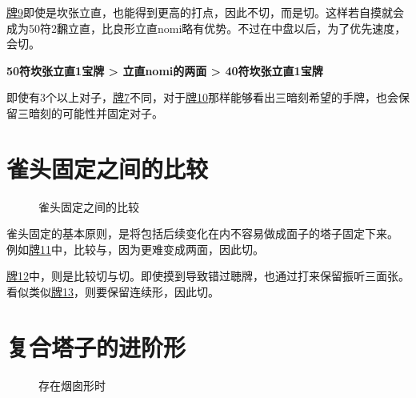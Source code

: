 \hyperref[lec7:pai8-10]{牌9}即使是坎张立直，也能得到更高的打点，因此不切，而是切。这样若自摸就会成为50符2飜立直，比良形立直nomi略有优势。不过在中盘以后，为了优先速度，会切。

\par\bigskip
\textbf{50符坎张立直1宝牌 > 立直nomi的两面 > 40符坎张立直1宝牌}
\par\bigskip

即使有3个以上对子，\hyperref[lec7:pai5-7]{牌7}不同，对于\hyperref[lec7:pai8-10]{牌10}那样能够看出三暗刻希望的手牌，也会保留三暗刻的可能性并固定对子。

\section{雀头固定之间的比较}
\begin{figure}[h]
    \caption{雀头固定之间的比较}
    \label{lec7:pai11-13}
    \par\bigskip
    \par\bigskip
\end{figure}

雀头固定的基本原则，是将包括后续变化在内不容易做成面子的塔子固定下来。
例如\hyperref[lec7:pai11-13]{牌11}中，比较与，因为更难变成两面，因此切。

\hyperref[lec7:pai11-13]{牌12}中，则是比较切与切。即使摸到导致错过聴牌，也通过打来保留振听三面张。
看似类似\hyperref[lec7:pai11-13]{牌13}，则要保留连续形，因此切。

\section{复合塔子的进阶形}
\begin{figure}[h]
    \caption{存在烟囱形时}
    \label{lec7:pai14-16}
    \par\bigskip
    \par\bigskip
\end{figure}

